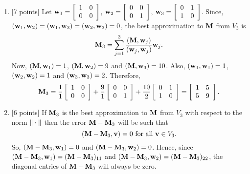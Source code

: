 \begin{solution}
\begin{enumerate}
\item {[7 points]} Let ${\bf w}_1=\left[\begin{array}{cc}1 & 0 \\ 0 & 0\end{array}\right]$, ${\bf w}_2=\left[\begin{array}{cc}0 & 0 \\ 0 & 1\end{array}\right]$, ${\bf w}_3=\left[\begin{array}{cc}0 & 1 \\ 1 & 0\end{array}\right]$. Since, $({\bf w}_1,{\bf w}_2)=({\bf w}_1,{\bf w}_3)=({\bf w}_2,{\bf w}_3)=0$, the best approximation to ${\bf M}$ from $V_3$ is
\[
{\bf M}_3=\sum_{j=1}^3{({\bf M},{\bf w}_j) \over ({\bf w}_j,{\bf w}_j)}{\bf w}_j.
\]
Now, $({\bf M},{\bf w}_1)=1$, $({\bf M},{\bf w}_2)=9$ and $({\bf M},{\bf w}_3)=10$. Also, $({\bf w}_1,{\bf w}_1)=1$, $({\bf w}_2,{\bf w}_2)=1$ and $({\bf w}_3,{\bf w}_3)=2$. Therefore,
\[
{\bf M}_3={1 \over 1}\left[\begin{array}{cc}1 & 0 \\ 0 & 0\end{array}\right]+{9 \over 1}\left[\begin{array}{cc}0 & 0 \\ 0 & 1\end{array}\right]+{10 \over 2}\left[\begin{array}{cc}0 & 1 \\ 1 & 0\end{array}\right]=\left[\begin{array}{cc}1 & 5 \\ 5 & 9\end{array}\right].
\]



\item {[6 points]} If ${\bf M}_3$ is the best approximation to ${\bf M}$ from $V_3$ with respect to the norm $\|\cdot\|$ then the error ${\bf M}-{\bf M}_3$ will be such that
\[
({\bf M}-{\bf M}_3,{\bf v})=0\mbox{ for all }{\bf v}\in V_3.
\]
So, $({\bf M}-{\bf M}_3,{\bf w}_1)=0$ and $({\bf M}-{\bf M}_3,{\bf w}_2)=0$. Hence, since $({\bf M}-{\bf M}_3,{\bf w}_1)=({\bf M}-{\bf M}_3)_{11}$ and $({\bf M}-{\bf M}_3,{\bf w}_2)=({\bf M}-{\bf M}_3)_{22}$, the diagonal entries of ${\bf M}-{\bf M}_3$ will always be zero.


\end{enumerate}
\end{solution}
